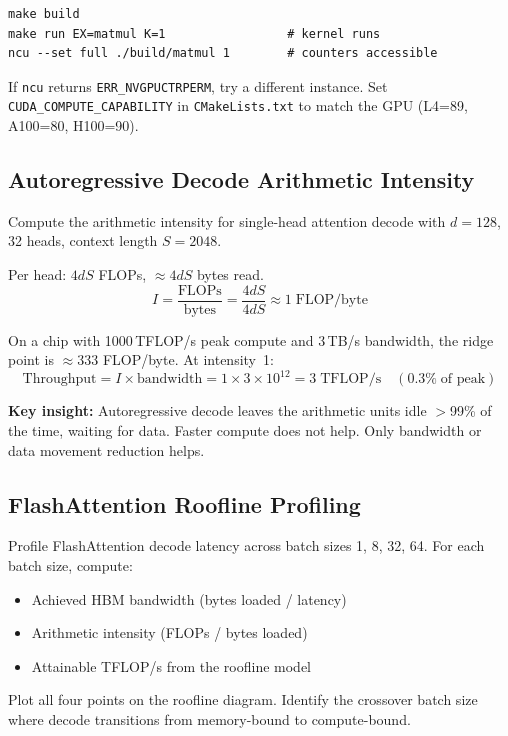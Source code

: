 \documentclass[11pt, letterpaper]{article}
\begin{document}
\begin{verbatim}
make build
make run EX=matmul K=1                 # kernel runs
ncu --set full ./build/matmul 1        # counters accessible
\end{verbatim}

If \texttt{ncu} returns \texttt{ERR\_NVGPUCTRPERM}, try a different instance. Set \texttt{CUDA\_COMPUTE\_CAPABILITY} in \texttt{CMakeLists.txt} to match the GPU (L4=89, A100=80, H100=90).

\subsection{Autoregressive Decode Arithmetic Intensity}

\begin{principle}
Compute the arithmetic intensity for single-head attention decode with $d = 128$, 32 heads, context length $S = 2048$.

Per head: $4dS$ FLOPs, $\approx 4dS$ bytes read.
\[
  I = \frac{\text{FLOPs}}{\text{bytes}} = \frac{4dS}{4dS} \approx 1 \;\text{FLOP/byte}
\]

On a chip with 1000\,TFLOP/s peak compute and 3\,TB/s bandwidth, the ridge point is $\approx 333$ FLOP/byte. At intensity~1:
\[
  \text{Throughput} = I \times \text{bandwidth} = 1 \times 3 \times 10^{12} = 3\;\text{TFLOP/s} \quad (0.3\%\;\text{of peak})
\]

\textbf{Key insight:} Autoregressive decode leaves the arithmetic units idle $>$99\% of the time, waiting for data. Faster compute does not help. Only bandwidth or data movement reduction helps.
\end{principle}

\subsection{FlashAttention Roofline Profiling}

Profile FlashAttention decode latency across batch sizes 1, 8, 32, 64. For each batch size, compute:
\begin{itemize}
\item Achieved HBM bandwidth (bytes loaded / latency)
\item Arithmetic intensity (FLOPs / bytes loaded)
\item Attainable TFLOP/s from the roofline model
\end{itemize}

Plot all four points on the roofline diagram. Identify the crossover batch size where decode transitions from memory-bound to compute-bound.
\end{document}
